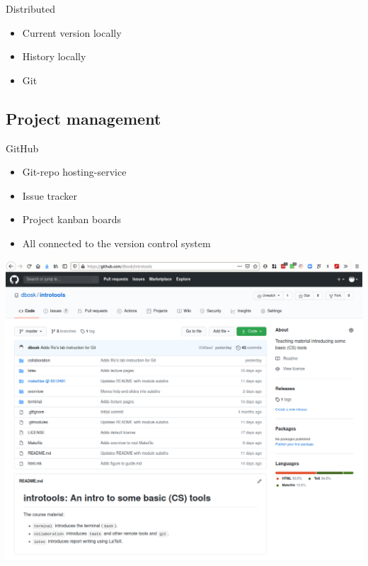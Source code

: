 \begin{frame}
  \begin{block}{Distributed}
    \begin{itemize}
      \item Current version locally
      \item History locally
    \end{itemize}
  \end{block}

  \pause

  \begin{example}
    \begin{itemize}
      \item Git
    \end{itemize}
  \end{example}
\end{frame}

\subsection{Project management}

\begin{frame}
  \begin{block}{GitHub}
    \begin{itemize}
      \item Git-repo hosting-service
      \item Issue tracker
      \item Project kanban boards
      \item All connected to the version control system
    \end{itemize}
  \end{block}
\end{frame}

\begin{frame}
  \centering
  \includegraphics[height=\textheight]{figs/github-introtools.png}
\end{frame}


